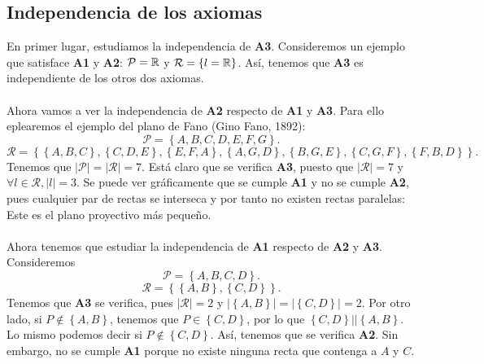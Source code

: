 \subsection{Independencia de los axiomas}
En primer lugar, estudiamos la independencia de \textbf{A3}. Consideremos un ejemplo que satisface \textbf{A1} y \textbf{A2}: $\displaystyle \mathcal{P} = \mathbb{R} $ y $\displaystyle \mathcal{R} = \left\{ l = \mathbb{R}\right\}  $. Así, tenemos que \textbf{A3} es independiente de los otros dos axiomas. \\ \\
Ahora vamos a ver la independencia de \textbf{A2} respecto de \textbf{A1} y \textbf{A3}. Para ello eplearemos el ejemplo del plano de Fano (Gino Fano, 1892):
\[\mathcal{P} = \left\{ A, B, C, D, E, F, G\right\}  .\]
\[\mathcal{R} = \left\{ \left\{ A, B, C\right\}, \left\{ C, D, E\right\}, \left\{ E, F, A\right\}, \left\{ A, G, D\right\}, \left\{ B, G, E\right\}, \left\{ C, G, F\right\} , \left\{ F, B, D\right\} \right\}  .\]
Tenemos que $\displaystyle \left|\mathcal{P}\right| = \left|\mathcal{R}\right| = 7 $. Está claro que se verifica \textbf{A3}, puesto que $\displaystyle \left|\mathcal{R}\right| = 7 $ y $\displaystyle \forall l \in \mathcal{R}, \left|l\right| = 3 $. 
Se puede ver gráficamente que se cumple \textbf{A1} y no se cumple \textbf{A2}, pues cualquier par de rectas se interseca y por tanto no existen rectas paralelas:
Este es el plano proyectivo más pequeño. \\ \\
Ahora tenemos que estudiar la independencia de \textbf{A1} respecto de \textbf{A2} y \textbf{A3}. Consideremos
\[\mathcal{P}= \left\{ A, B, C, D\right\}  .\]
\[\mathcal{R} = \left\{ \left\{ A, B\right\} , \left\{ C, D\right\} \right\}  .\]
Tenemos que \textbf{A3} se verifica, pues $\displaystyle \left|\mathcal{R}\right| = 2 $ y $\displaystyle \left| \left\{ A,B\right\} \right| = \left| \left\{ C, D\right\} \right| = 2 $. Por otro lado, si $\displaystyle P \not\in \left\{ A,B\right\}  $, tenemos que $\displaystyle P \in \left\{ C,D\right\}  $, por lo que $\displaystyle \left\{ C,D\right\} | | \left\{ A,B\right\}  $. Lo mismo podemos decir si $\displaystyle P \not\in \left\{ C,D\right\}  $. Así, tenemos que se verifica \textbf{A2}. Sin embargo, no se cumple \textbf{A1} porque no existe ninguna recta que contenga a $\displaystyle A $ y $\displaystyle C $.
